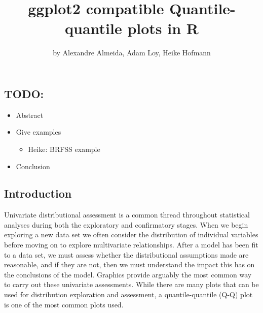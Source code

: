 \title{ggplot2 compatible Quantile-quantile plots in R}
\author{by Alexandre Almeida, Adam Loy, Heike Hofmann}

\maketitle


\newcommand{\hh}[1]{{\textcolor{orange}{#1}}}

\subsection{TODO:}\label{todo}

\begin{itemize}
\tightlist
\item
  Abstract
\item
  Give examples

  \begin{itemize}
  \tightlist
  \item
    Heike: BRFSS example
  \end{itemize}
\item
  Conclusion
\end{itemize}

\subsection{Introduction}\label{introduction}

\label{sec:introduction}

Univariate distributional assessment is a common thread throughout
statistical analyses during both the exploratory and confirmatory
stages. When we begin exploring a new data set we often consider the
distribution of individual variables before moving on to explore
multivariate relationships. After a model has been fit to a data set, we
must assess whether the distributional assumptions made are reasonable,
and if they are not, then we must understand the impact this has on the
conclusions of the model. Graphics provide arguably the most common way
to carry out these univariate assessments. While there are many plots
that can be used for distribution exploration and assessment, a
quantile-quantile (Q-Q) plot \citep{Wilk1968-ii} is one of the most
common plots used.

